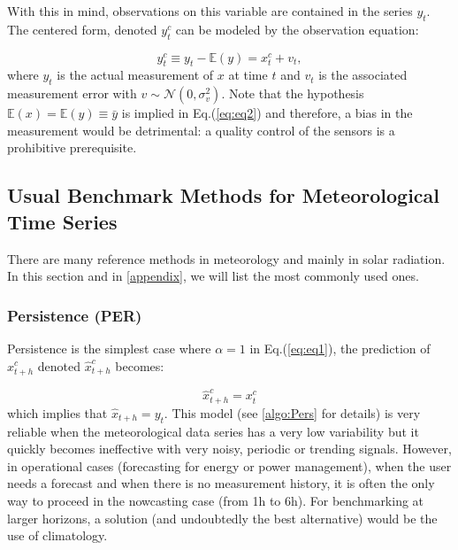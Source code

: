 With this in mind, observations on this variable are contained in the series $y_t$. The centered form, denoted $y^c_t$ can be modeled by the observation equation:

\begin{equation}
\label{eq:eq2}
y^c_{t}\equiv y_t-\mathbb{E}(y)=x^c_t+v_{t},
\end{equation}
where $y_t$ is the actual measurement of $x$ at time $t$ and $v_t$ is the associated measurement error with $v\sim\mathcal{N}(0,\sigma^2_{v})$. Note that the hypothesis $\mathbb{E}(x)=\mathbb{E}(y)\equiv \bar{y}$ is implied in Eq.(\ref{eq:eq2}) and therefore, a bias in the measurement would be detrimental: a quality control of the sensors is a prohibitive prerequisite. 

\subsection{Usual Benchmark Methods for Meteorological Time Series}
There are many reference methods in meteorology and mainly in solar radiation. In this section and in \ref{appendix}, we will list the most commonly used ones.  

\subsubsection{Persistence \textnormal{(PER)}}
\label{sec:subsec1}
Persistence is the simplest case where $\alpha=1$ in Eq.(\ref{eq:eq1}), the prediction of $x^c_{t+h}$ denoted $\widehat{x}^c_{t+h}$ becomes:

\begin{equation}
\label{eq:eq3}
\widehat{x}^c_{t+h}=x^c_t
\end{equation}
which implies that $\widehat{x}_{t+h}=y_t$. This model (see \ref{algo:Pers} for details) is very reliable when the  meteorological data series has a very low variability but it quickly becomes ineffective with very noisy, periodic or trending signals. However, in  operational cases (forecasting for energy or power management), when the user needs a forecast and when there is no measurement history, it is often the only way to proceed in the nowcasting case (from 1h to 6h). For benchmarking at larger horizons, a solution (and undoubtedly the best alternative) would be the use of climatology. 

